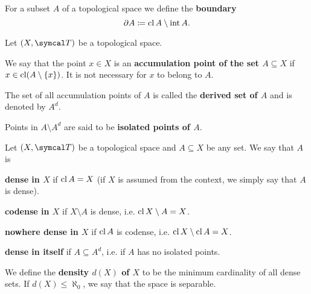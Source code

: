 \begin{definition}\label{def:topological_boundary}\cite[24]{Engelking1989}
  For a subset \( A \) of a topological space we define the \textbf{boundary}
  \begin{equation*}
    \partial A \coloneqq \operatorname{cl}{A} \setminus \operatorname{int}{A}.
  \end{equation*}
\end{definition}

\begin{definition}\label{def:topologically_derived_set}\cite[24]{Engelking1989}
  Let \( (X, \Cal{T}) \) be a topological space.

  \begin{defenum}
     We say that the point \( x \in X \) is an \textbf{accumulation point of the set \( A \subseteq X \)} if \( x \in \operatorname{cl}(A \setminus \{ x \}) \). It is not necessary for \( x \) to belong to \( A \).

     The set of all accumulation points of \( A \) is called the \textbf{derived set of \( A \)} and is denoted by \( A^d \).

     Points in \( A \setminus A^d \) are said to be \textbf{isolated points of \( A \)}.
  \end{defenum}
\end{definition}

\begin{definition}\label{def:topologically_dense_set}\cite[25]{Engelking1989}
  Let \( (X, \Cal{T}) \) be a topological space and \( A \subseteq X \) be any set. We say that \( A \) is

  \begin{defenum}
     \textbf{dense in \( X \)} if \( \operatorname{cl}{A} = X \) (if \( X \) is assumed from the context, we simply say that \( A \) is dense).

     \textbf{codense in \( X \)} if \( X \setminus A \) is dense, i.e. \( \operatorname{cl}{X \setminus A} = X \).

     \textbf{nowhere dense in \( X \)} if \( \operatorname{cl}{A} \) is codense, i.e. \( \operatorname{cl}{X \setminus \operatorname{cl}{A}} = X \).

     \textbf{dense in itself} if \( A \subseteq A^d \), i.e. if \( A \) has no isolated points.
  \end{defenum}

  We define the \textbf{density \( d(X) \) of \( X \)} to be the minimum cardinality of all dense sets. If \( d(X) \leq \aleph_0 \), we say that the space is separable.
\end{definition}

